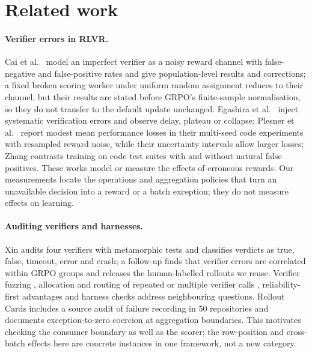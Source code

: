 \documentclass[11pt,a4paper]{article}
\begin{document}
\section{Related work}
\paragraph{Verifier errors in RLVR.} Cai et al.\ \cite{cai} model an imperfect verifier as a noisy reward channel with false-negative and false-positive rates and give population-level results and corrections; a fixed broken scoring worker under uniform random assignment reduces to their channel, but their results are stated before GRPO's finite-sample normalisation, so they do not transfer to the default update unchanged. Egashira et al.\ \cite{egashira} inject systematic verification errors and observe delay, plateau or collapse; Plesner et al.\ \cite{plesner} report modest mean performance losses in their multi-seed code experiments with resampled reward noise, while their uncertainty intervals allow larger losses; Zhang \cite{zhangleaky} contrasts training on code test suites with and without natural false positives. These works model or measure the effects of erroneous rewards. Our measurements locate the operations and aggregation policies that turn an unavailable decision into a reward or a batch exception; they do not measure effects on learning.

\paragraph{Auditing verifiers and harnesses.} Xin \cite{xinaudit} audits four verifiers with metamorphic tests and classifies verdicts as true, false, timeout, error and crash; a follow-up \cite{xingroup} finds that verifier errors are correlated within GRPO groups and releases the human-labelled rollouts we reuse. Verifier fuzzing \cite{ray}, allocation and routing of repeated or multiple verifier calls \cite{routeaudit,vstress}, reliability-first advantages \cite{star} and harness checks \cite{pan} address neighbouring questions. Rollout Cards \cite{rollout} includes a source audit of failure recording in 50 repositories and documents exception-to-zero coercion at aggregation boundaries. This motivates checking the consumer boundary as well as the scorer; the row-position and cross-batch effects here are concrete instances in one framework, not a new category.
\end{document}

